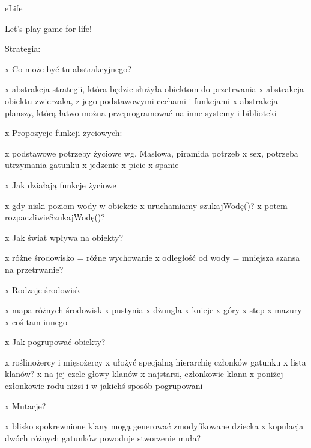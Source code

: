 e\-Life
\begin{DoxyItemize}
\item Let's play game for life!
\end{DoxyItemize}

Strategia\-:

x Co może być tu abstrakcyjnego? \begin{DoxyVerb}    x abstrakcja strategii, która będzie służyła obiektom do przetrwania
    x abstrakcja obiektu-zwierzaka, z jego podstawowymi cechami i funkcjami
    x abstrakcja planszy, którą łatwo można przeprogramować na inne systemy i biblioteki
\end{DoxyVerb}


x Propozycje funkcji życiowych\-: \begin{DoxyVerb}    x podstawowe potrzeby życiowe wg. Maslowa, piramida potrzeb    
    x sex, potrzeba utrzymania gatunku
    x jedzenie
    x picie
    x spanie
\end{DoxyVerb}


x Jak działają funkcje życiowe \begin{DoxyVerb}    x gdy niski poziom wody w obiekcie
            x uruchamiamy szukajWodę()?
                    x potem rozpaczliwieSzukajWodę()?
\end{DoxyVerb}


x Jak świat wpływa na obiekty? \begin{DoxyVerb}    x różne środowisko = różne wychowanie
    x odległość od wody = mniejsza szansa na przetrwanie?
\end{DoxyVerb}


x Rodzaje środowisk \begin{DoxyVerb}    x mapa różnych środowisk
    x pustynia
    x dżungla
    x knieje
    x góry
    x step
    x mazury
    x coś tam innego
\end{DoxyVerb}


x Jak pogrupować obiekty? \begin{DoxyVerb}    x roślinożercy i mięsożercy
    x ułożyć specjalną hierarchię członków gatunku
    x lista klanów? 
            x na jej czele głowy klanów
            x najstarsi, członkowie klanu
            x poniżej członkowie rodu niżsi i w jakichś sposób pogrupowani
\end{DoxyVerb}


x Mutacje? \begin{DoxyVerb}    x blisko spokrewnione klany mogą generować zmodyfikowane dziecka
    x kopulacja dwóch różnych gatunków powoduje stworzenie muła?\end{DoxyVerb}
 